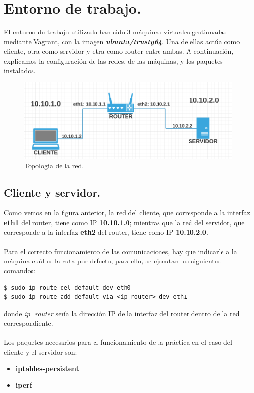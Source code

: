 \documentclass[11pt]{article}
\begin{document}
\section{Entorno de trabajo.}
El entorno de trabajo utilizado han sido 3 máquinas virtuales gestionadas mediante Vagrant, con la imagen \textbf{\textit{ubuntu/trusty64}}. Una de ellas actúa como cliente, otra como servidor y otra como router entre ambas. A continuación, explicamos la configuración de las redes, de las máquinas, y los paquetes instalados.
\begin{figure}[hbtp]
\centering
\includegraphics[scale=0.5]{top.png}
\caption{Topología de la red.}
\end{figure}

\subsection{Cliente y servidor.} 
Como vemos en la figura anterior, la red del cliente, que corresponde a la interfaz \textbf{eth1} del router, tiene como IP \textbf{10.10.1.0}; mientras que la red del servidor, que corresponde a la interfaz \textbf{eth2} del router, tiene como IP \textbf{10.10.2.0}. \\ \\
Para el correcto funcionamiento de las comunicaciones, hay que indicarle a la máquina cuál es la ruta por defecto, para ello, se ejecutan los siguientes comandos:

\begin{lstlisting}[style=C, numbers=none]
$ sudo ip route del default dev eth0
$ sudo ip route add default via <ip_router> dev eth1
\end{lstlisting}
donde \textit{ip\_router} sería la dirección IP de la interfaz del router dentro de la red correspondiente. \\ \\
\newpage
Los paquetes necesarios para el funcionamiento de la práctica en el caso del cliente y el servidor son:
\begin{itemize}
\item \textbf{iptables-persistent}
\item \textbf{iperf}
\end{itemize}
\end{document}
